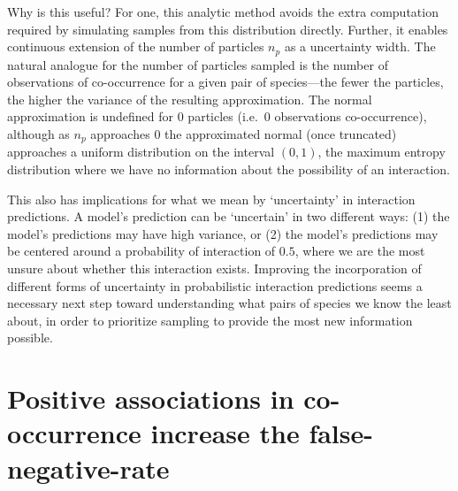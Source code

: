 \documentclass[11pt]{article}
\begin{document}
Why is this useful? For one, this analytic method avoids the extra
computation required by simulating samples from this distribution
directly. Further, it enables continuous extension of the number of
particles \(n_p\) as a uncertainty width. The natural analogue for the
number of particles sampled is the number of observations of
co-occurrence for a given pair of species---the fewer the particles, the
higher the variance of the resulting approximation. The normal
approximation is undefined for 0 particles (i.e.~0 observations
co-occurrence), although as \(n_p\) approaches 0 the approximated normal
(once truncated) approaches a uniform distribution on the interval
\((0,1)\), the maximum entropy distribution where we have no information
about the possibility of an interaction.

This also has implications for what we mean by `uncertainty' in
interaction predictions. A model's prediction can be `uncertain' in two
different ways: (1) the model's predictions may have high variance, or
(2) the model's predictions may be centered around a probability of
interaction of \(0.5\), where we are the most unsure about whether this
interaction exists. Improving the incorporation of different forms of
uncertainty in probabilistic interaction predictions seems a necessary
next step toward understanding what pairs of species we know the least
about, in order to prioritize sampling to provide the most new
information possible.

\hypertarget{positive-associations-in-co-occurrence-increase-the-false-negative-rate}{%
\section{Positive associations in co-occurrence increase the
false-negative-rate}\label{positive-associations-in-co-occurrence-increase-the-false-negative-rate}}
\end{document}
